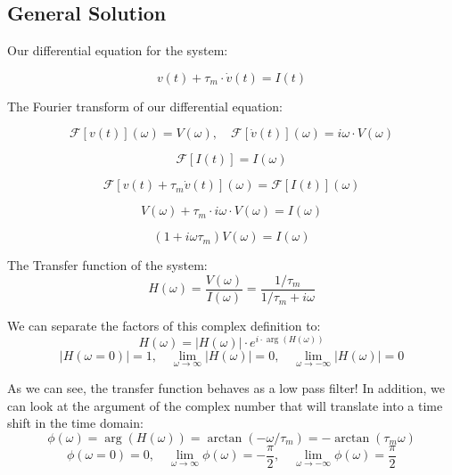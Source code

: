 \subsection{General Solution}

Our differential equation for the system:

\begin{equation}
    v(t) + \tau_m \cdot \dot{v}(t) = I(t)
\end{equation}

The Fourier transform of our differential equation:

\begin{equation}
    \mathcal{F}[v(t)](\omega) = V(\omega), \quad \mathcal{F}[\dot{v}(t)](\omega) = i\omega \cdot V(\omega)
\end{equation}

\begin{equation}
    \mathcal{F}[I(t)] = I(\omega)
\end{equation}

\begin{equation}
    \mathcal{F}[v(t) + \tau_m \dot{v}(t)](\omega) = \mathcal{F}[I(t)](\omega)
\end{equation}

\begin{equation}
    V(\omega) + \tau_m \cdot i \omega \cdot V(\omega) = I(\omega)
\end{equation}

\begin{equation}
(1 + i\omega \tau_m) V(\omega) = I(\omega)
\end{equation}

The Transfer function of the system:
\begin{equation}
H(\omega) = \frac{V(\omega)}{I(\omega)} = \frac{1/\tau_m}{1/\tau_m + i\omega}
\end{equation}

We can separate the factors of this complex definition to:
\begin{equation}
H(\omega) = |H(\omega)| \cdot e^{i \cdot \arg(H(\omega))}
\end{equation}
\begin{equation}
|H(\omega = 0)| = 1, \quad \lim_{\omega \to \infty} |H(\omega)| = 0, \quad \lim_{\omega \to -\infty} |H(\omega)| = 0
\end{equation}

As we can see, the transfer function behaves as a low pass filter!
In addition, we can look at the argument of the complex number that will translate into a time shift in the time domain:
\begin{equation}
\phi(\omega) = \arg(H(\omega)) = \arctan(-\omega/\tau_m) = -\arctan(\tau_m \omega)
\end{equation}
\begin{equation}
\phi(\omega = 0) = 0, \quad \lim_{\omega \to \infty} \phi(\omega) = -\frac{\pi}{2}, \quad \lim_{\omega \to -\infty} \phi(\omega) = \frac{\pi}{2}
\end{equation}

